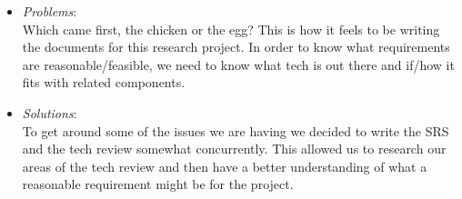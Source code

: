\documentclass[compsoc,draftclsnofoot,onecolumn,10pt]{IEEEtran}
\begin{document}
\begin{itemize}
        \item \textit{Problems}:\\
            Which came first, the chicken or the egg? This is how it feels to be
            writing the documents for this research project. In order to know what
            requirements are reasonable/feasible, we need to know what tech is out
            there and if/how it fits with related components.

        \item \textit{Solutions}:\\
            To get around some of the issues we are having we decided to write
            the SRS and the tech review somewhat concurrently. This allowed us
            to research our areas of the tech review and then have a better
            understanding of what a reasonable requirement might be for the
            project.

	\end{itemize}
   
\end{document}
